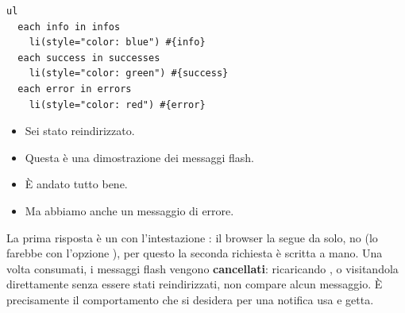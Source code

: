 \begin{affianco}[0.5][c]
\begin{lstlisting}[style=pug, name=views/flash.pug]
ul
  each info in infos
    li(style="color: blue") #{info}
  each success in successes
    li(style="color: green") #{success}
  each error in errors
    li(style="color: red") #{error}
\end{lstlisting}
\risultato
\begin{browser}
  \begin{itemize}[leftmargin=1.8em, itemsep=0pt, topsep=2pt, parsep=0pt]
    \item {\color{css-blue}Sei stato reindirizzato.}
    \item {\color{css-blue}Questa è una dimostrazione dei messaggi flash.}
    \item {\color{css-green}È andato tutto bene.}
    \item {\color{css-red}Ma abbiamo anche un messaggio di errore.}
  \end{itemize}
\end{browser}
\end{affianco}


La prima risposta è un  con l'intestazione : il
browser la segue da solo,  no (lo farebbe con l'opzione ),
per questo la seconda richiesta è scritta a mano. Una volta consumati, i
messaggi flash vengono \textbf{cancellati}: ricaricando , o
visitandola direttamente senza essere stati reindirizzati, non compare alcun
messaggio. È precisamente il comportamento che si desidera per una notifica
\guillemotleft usa e getta\guillemotright.

